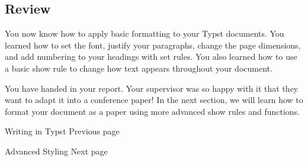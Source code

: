 \subsection{Review}\label{review}

You now know how to apply basic formatting to your Typst documents. You
learned how to set the font, justify your paragraphs, change the page
dimensions, and add numbering to your headings with set rules. You also
learned how to use a basic show rule to change how text appears
throughout your document.

You have handed in your report. Your supervisor was so happy with it
that they want to adapt it into a conference paper! In the next section,
we will learn how to format your document as a paper using more advanced
show rules and functions.

\href{/docs/tutorial/writing-in-typst/}{\pandocbounded{}}

{ Writing in Typst } { Previous page }

\href{/docs/tutorial/advanced-styling/}{\pandocbounded{}}

{ Advanced Styling } { Next page }
